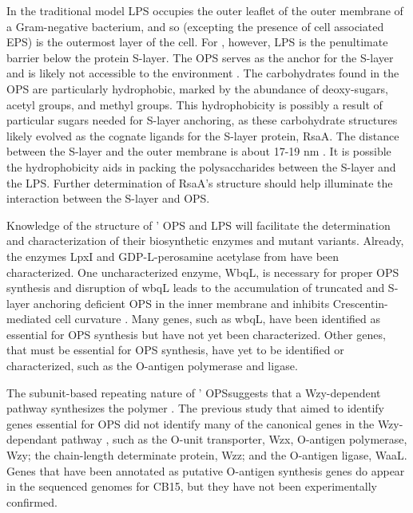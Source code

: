 	In the traditional model \ac{LPS} occupies the outer leaflet of the outer membrane of a Gram-negative bacterium, and so (excepting the presence of cell associated \ac{EPS}) is the outermost layer of the cell. For \caulobacter, however, \ac{LPS} is the penultimate barrier below the protein \ac{S-layer}. The \caulobacter{} \ac{OPS} serves as the anchor for the S-layer and is likely not accessible to the environment . The carbohydrates found in the OPS are particularly hydrophobic, marked by the abundance of deoxy-sugars, acetyl groups, and methyl groups. This hydrophobicity is possibly a result of particular sugars needed for \ac{S-layer} anchoring, as these carbohydrate structures likely evolved as the cognate ligands for the \ac{S-layer} protein, RsaA. The distance between the \ac{S-layer} and the outer membrane is about 17-19 nm . It is possible the hydrophobicity aids in packing the polysaccharides between the S-layer and the \ac{LPS}. Further determination of RsaA’s structure should help illuminate the interaction between the S-layer and \ac{OPS}.

	Knowledge of the structure of \caulobacter’ \ac{OPS} and \ac{LPS} will facilitate the determination and characterization of their biosynthetic enzymes and mutant variants. Already, the enzymes LpxI  and GDP-L-perosamine acetylase  from \caulobacter have been characterized. One uncharacterized enzyme, WbqL, is necessary for proper \ac{OPS} synthesis and disruption of wbqL leads to the accumulation of truncated and S-layer anchoring deficient \ac{OPS} in the inner membrane and inhibits Crescentin-mediated cell curvature . Many genes, such as wbqL, have been identified as essential for \ac{OPS} synthesis  but have not yet been characterized. Other genes, that must be essential for \ac{OPS} synthesis, have yet to be identified or characterized, such as the O-antigen polymerase and ligase.

	The subunit-based repeating nature of \caulobacter’ \ac{OPS}suggests that a Wzy-dependent pathway synthesizes the polymer . The previous study that aimed to identify genes essential for \ac{OPS} did not identify many of the canonical genes in the Wzy-dependant pathway , such as the O-unit transporter, Wzx, O-antigen polymerase, Wzy; the chain-length determinate protein, Wzz; and the O-antigen ligase, WaaL. Genes that have been annotated as putative O-antigen synthesis genes do appear in the sequenced genomes for \caulobacter CB15, but they have not been experimentally confirmed. 

